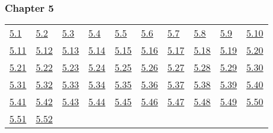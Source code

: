 \subsubsection*{Chapter 5} 

\begin{tabular}{llllllllll}
\hyperref[Exercise 5.1]{5.1} &
\hyperref[Exercise 5.2]{5.2} &
\hyperref[Exercise 5.3]{5.3} &
\hyperref[Exercise 5.4]{5.4} &
\hyperref[Exercise 5.5]{5.5} &
\hyperref[Exercise 5.6]{5.6} &
\hyperref[Exercise 5.7]{5.7} &
\hyperref[Exercise 5.8]{5.8} &
\hyperref[Exercise 5.9]{5.9} &
\hyperref[Exercise 5.10]{5.10}
\\ 
\hyperref[Exercise 5.11]{5.11} &
\hyperref[Exercise 5.12]{5.12} &
\hyperref[Exercise 5.13]{5.13} &
\hyperref[Exercise 5.14]{5.14} &
\hyperref[Exercise 5.15]{5.15} &
\hyperref[Exercise 5.16]{5.16} &
\hyperref[Exercise 5.17]{5.17} &
\hyperref[Exercise 5.18]{5.18} &
\hyperref[Exercise 5.19]{5.19} &
\hyperref[Exercise 5.20]{5.20}
\\ 
\hyperref[Exercise 5.21]{5.21} &
\hyperref[Exercise 5.22]{5.22} &
\hyperref[Exercise 5.23]{5.23} &
\hyperref[Exercise 5.24]{5.24} &
\hyperref[Exercise 5.25]{5.25} &
\hyperref[Exercise 5.26]{5.26} &
\hyperref[Exercise 5.27]{5.27} &
\hyperref[Exercise 5.28]{5.28} &
\hyperref[Exercise 5.29]{5.29} &
\hyperref[Exercise 5.30]{5.30}
\\ 
\hyperref[Exercise 5.31]{5.31} &
\hyperref[Exercise 5.32]{5.32} &
\hyperref[Exercise 5.33]{5.33} &
\hyperref[Exercise 5.34]{5.34} &
\hyperref[Exercise 5.35]{5.35} &
\hyperref[Exercise 5.36]{5.36} &
\hyperref[Exercise 5.37]{5.37} &
\hyperref[Exercise 5.38]{5.38} &
\hyperref[Exercise 5.39]{5.39} &
\hyperref[Exercise 5.40]{5.40}
\\ 
\hyperref[Exercise 5.41]{5.41} &
\hyperref[Exercise 5.42]{5.42} &
\hyperref[Exercise 5.43]{5.43} &
\hyperref[Exercise 5.44]{5.44} &
\hyperref[Exercise 5.45]{5.45} &
\hyperref[Exercise 5.46]{5.46} &
\hyperref[Exercise 5.47]{5.47} &
\hyperref[Exercise 5.48]{5.48} &
\hyperref[Exercise 5.49]{5.49} &
\hyperref[Exercise 5.50]{5.50}
\\ 
\hyperref[Exercise 5.51]{5.51} &
\hyperref[Exercise 5.52]{5.52} &
\end{tabular} 

